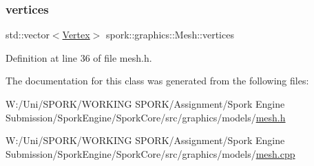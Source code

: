 \subsubsection{\texorpdfstring{vertices}{vertices}}
{\footnotesize\ttfamily std\+::vector$<$\hyperlink{structspork_1_1graphics_1_1_vertex}{Vertex}$>$ spork\+::graphics\+::\+Mesh\+::vertices}



Definition at line 36 of file mesh.\+h.



The documentation for this class was generated from the following files\+:\begin{DoxyCompactItemize}
\item 
W\+:/\+Uni/\+S\+P\+O\+R\+K/\+W\+O\+R\+K\+I\+N\+G S\+P\+O\+R\+K/\+Assignment/\+Spork Engine Submission/\+Spork\+Engine/\+Spork\+Core/src/graphics/models/\hyperlink{mesh_8h}{mesh.\+h}\item 
W\+:/\+Uni/\+S\+P\+O\+R\+K/\+W\+O\+R\+K\+I\+N\+G S\+P\+O\+R\+K/\+Assignment/\+Spork Engine Submission/\+Spork\+Engine/\+Spork\+Core/src/graphics/models/\hyperlink{mesh_8cpp}{mesh.\+cpp}\end{DoxyCompactItemize}
